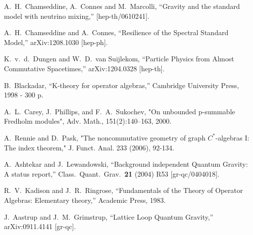 \documentclass[12pt]{article}
\begin{document}
\begin{thebibliography}{99}
  A.~H.~Chamseddine, A.~Connes and M.~Marcolli,
  ``Gravity and the standard model with neutrino mixing,''
  [hep-th/0610241].


  A.~H.~Chamseddine and A.~Connes,
  ``Resilience of the Spectral Standard Model,''
  arXiv:1208.1030 [hep-ph].



  K.~v.~d.~Dungen and W.~D.~van Suijlekom,
  ``Particle Physics from Almost Commutative Spacetimes,''
  arXiv:1204.0328 [hep-th].






  B.~Blackadar,
  ``K-theory for operator algebras,''
 Cambridge University Press, 1998 - 300 p.





A.~L.~Carey, J.~Phillips, and F.~A.~Sukochev, "On unbounded p-summable Fredholm modules", 
Adv. Math., 151(2):140--163, 2000.




A.~Rennie and D.~Pask,
"The noncommutative geometry of graph $C^*$-algebras I: The index theorem,"
J. Funct. Anal. 233 (2006), 92-134.






  A.~Ashtekar and J.~Lewandowski,
  ``Background independent Quantum Gravity: A status report,''
  Class.\ Quant.\ Grav.\  {\bf 21} (2004) R53
  [gr-qc/0404018].





  R.~V.~Kadison and J.~R.~Ringrose,
  ``Fundamentals of the Theory of Operator Algebras: Elementary theory,''
  Academic Press, 1983.
  
  




  J.~Aastrup and J.~M.~Grimstrup,
  ``Lattice Loop Quantum Gravity,''
  arXiv:0911.4141 [gr-qc].











\end{thebibliography}
\end{document}
